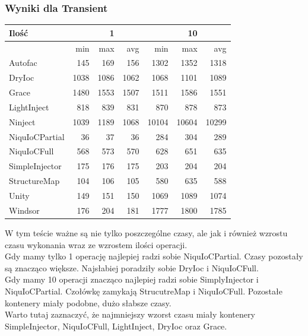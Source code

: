 \documentclass[12pt]{article}
\begin{document}
\subsubsection{Wyniki dla Transient}
\begin{center}
\begin{small}
	\begin{tabular}{ | l | r r r | r r r | }
    		\hline
     		Ilość & & 1 & & & 10 &  \\ \hline
     		 & min & max & avg & min & max & avg \\ \hline
		Autofac & 145 & 169 & 156 & 1302 & 1352 & 1318 \\ \hline
		DryIoc & 1038 & 1086 & 1062 & 1068 & 1101 & 1089 \\ \hline
		Grace & 1480 & 1553 & 1507 & 1511 & 1586 & 1551 \\ \hline
		LightInject & 818 & 839 & 831 & 870 & 878 & 873 \\ \hline
		Ninject & 1039 & 1189 & 1068 & 10104 & 10604 & 10299 \\ \hline
		NiquIoCPartial & 36 & 37 & 36 & 284 & 304 & 289 \\ \hline
		NiquIoCFull & 568 & 573 & 570 & 628 & 651 & 635 \\ \hline
		SimpleInjector & 175 & 176 & 175 & 203 & 204 & 204 \\ \hline
		StructureMap & 104 & 106 & 105 & 580 & 635 & 588 \\ \hline
		Unity & 149 & 151 & 150 & 1069 & 1089 & 1074 \\ \hline
		Windsor & 176 & 204 & 181 & 1777 & 1800 & 1785 \\
    		\hline
  	\end{tabular}
\end{small}
\end{center}
W tym teście ważne są nie tylko poszczególne czasy, ale jak i również wzrostu czasu wykonania wraz ze wzrostem ilości operacji.\\
Gdy mamy tylko 1 operację najlepiej radzi sobie NiquIoCPartial. Czasy pozostały są znacząco większe. Najsłabiej poradziły sobie DryIoc i NiquIoCFull.\\
Gdy mamy 10 operacji znacząco najlepiej radzi sobie SimplyInjector i NiquIoCPartial. Czołówkę zamykają StrucutreMap i NiquIoCFull. Pozostałe kontenery miały podobne, dużo słabsze czasy.\\
Warto tutaj zaznaczyć, że najmniejszy wzorst czasu miały kontenery SimpleInjector, NiquIoCFull, LightInject, DryIoc oraz Grace.
\end{document}
